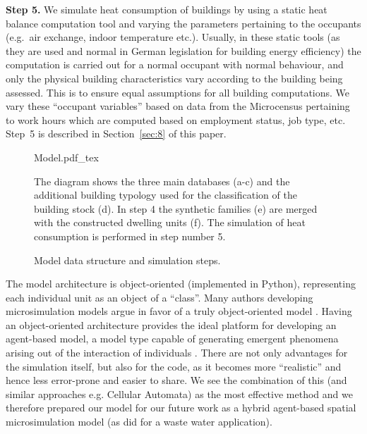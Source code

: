 \documentclass[11pt]{IJM-article}
\begin{document}
\textbf{Step 5.} We simulate heat consumption of buildings by using a static
heat balance computation tool and varying the parameters pertaining to the
occupants (e.g.\ air exchange, indoor temperature etc.). Usually, in these
static tools (as they are used and normal in German legislation for building
energy efficiency) the computation is carried out for a normal occupant with
normal behaviour, and only the physical building characteristics vary according
to the building being assessed. This is to ensure equal assumptions for all
building computations. We vary these ``occupant variables'' based on data from
the Microcensus pertaining to work hours which are computed based on employment
status, job type, etc. Step~5 is described in Section~\ref{sec:8} of this
paper.\\

\begin{figure}[htb] 
    \centering
    \caption{Model data structure and simulation steps.}
	\def\svgwidth{0.77\linewidth}
    {Model.pdf_tex} 
    \label{fig:1}\\
    \begin{flushleft}
    \begin{footnotesize}
    The diagram shows the three main databases (a-c) and the additional
building typology used for the classification of the building stock (d). In
step 4 the synthetic families (e) are merged with the constructed dwelling
units (f). The simulation of heat consumption is performed in step number 5.
    \end{footnotesize}
    \end{flushleft}
\end{figure}

The model architecture is object-oriented (implemented in Python), representing
each individual unit as an object of a ``class''. Many authors developing
microsimulation models argue in favor of a truly object-oriented model
. Having an object-oriented
architecture provides the ideal platform for developing an agent-based model, a
model type capable of generating emergent phenomena arising out of the
interaction of individuals . There are not only advantages
for the simulation itself, but also for the code, as it becomes more
``realistic'' and hence less error-prone and easier to share. We see the
combination of this (and similar approaches e.g. Cellular Automata) as the most
effective method and we therefore prepared our model for our future work as a
hybrid agent-based spatial microsimulation model (as did 
for a waste water application).
\end{document}
